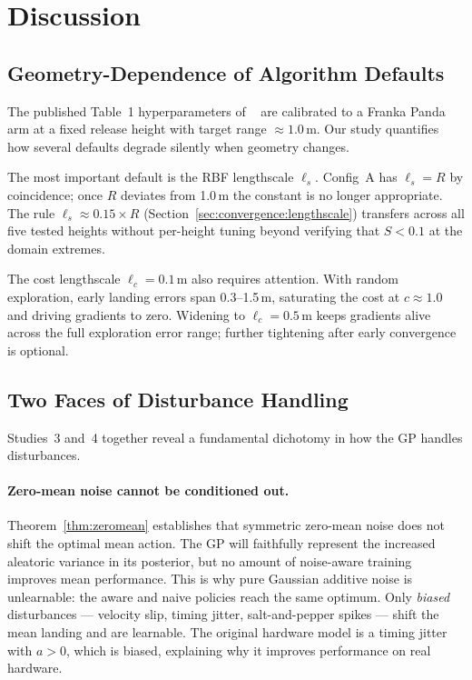 \section{Discussion}
\label{sec:discussion}

\subsection{Geometry-Dependence of Algorithm Defaults}
\label{sec:discussion:geometry}

The published Table~1 hyperparameters of \mcpilot{}~\cite{turcato2025mcpilot} are
calibrated to a Franka Panda arm at a fixed release height with target range
$\approx 1.0$\,m.
Our study quantifies how several defaults degrade silently when geometry changes.

The most important default is the RBF lengthscale $\ell_s$.
Config~A has $\ell_s = R$ by coincidence; once $R$ deviates from 1.0\,m the constant
is no longer appropriate.
The rule $\ell_s \approx 0.15 \times R$ (Section~\ref{sec:convergence:lengthscale})
transfers across all five tested heights without per-height tuning beyond verifying
that $S < 0.1$ at the domain extremes.

The cost lengthscale $\ell_c = 0.1$\,m also requires attention.
With random exploration, early landing errors span 0.3--1.5\,m, saturating the cost at
$c \approx 1.0$ and driving gradients to zero.
Widening to $\ell_c = 0.5$\,m keeps gradients alive across the full exploration error
range; further tightening after early convergence is optional.

\subsection{Two Faces of Disturbance Handling}
\label{sec:discussion:disturbances}

Studies~3 and~4 together reveal a fundamental dichotomy in how the GP handles disturbances.

\paragraph{Zero-mean noise cannot be conditioned out.}
Theorem~\ref{thm:zeromean} establishes that symmetric zero-mean noise does not shift
the optimal mean action.
The GP will faithfully represent the increased aleatoric variance in its posterior,
but no amount of noise-aware training improves mean performance.
This is why pure Gaussian additive noise is unlearnable: the aware and naive policies
reach the same optimum.
Only \emph{biased} disturbances --- velocity slip, timing jitter, salt-and-pepper
spikes --- shift the mean landing and are learnable.
The original \mcpilot{} hardware model is a timing jitter with $a > 0$, which is
biased, explaining why it improves performance on real hardware.

